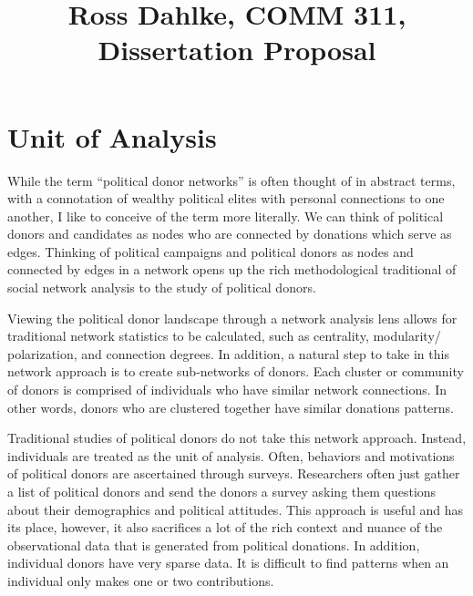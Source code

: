 \documentclass[12pt,]{article}
\title{Ross Dahlke, COMM 311, Dissertation Proposal  }
\author{}
\date{}
\begin{document}
	
%

{%
\setlength{\parindent}{0pt}
\thispagestyle{plain}
{\fontsize{18}{20}\selectfont\raggedright 
\maketitle  %

}

{
   \vskip 13.5pt\relax \normalsize\fontsize{11}{12} 
 

}

}






\vskip -8.5pt



\noindent \doublespacing 

\hypertarget{unit-of-analysis}{%
\section{Unit of Analysis}\label{unit-of-analysis}}

While the term ``political donor networks'' is often thought of in
abstract terms, with a connotation of wealthy political elites with
personal connections to one another, I like to conceive of the term more
literally. We can think of political donors and candidates as nodes who
are connected by donations which serve as edges. Thinking of political
campaigns and political donors as nodes and connected by edges in a
network opens up the rich methodological traditional of social network
analysis to the study of political donors.

Viewing the political donor landscape through a network analysis lens
allows for traditional network statistics to be calculated, such as
centrality, modularity/ polarization, and connection degrees. In
addition, a natural step to take in this network approach is to create
sub-networks of donors. Each cluster or community of donors is comprised
of individuals who have similar network connections. In other words,
donors who are clustered together have similar donations patterns.

Traditional studies of political donors do not take this network
approach. Instead, individuals are treated as the unit of analysis.
Often, behaviors and motivations of political donors are ascertained
through surveys. Researchers often just gather a list of political
donors and send the donors a survey asking them questions about their
demographics and political attitudes. This approach is useful and has
its place, however, it also sacrifices a lot of the rich context and
nuance of the observational data that is generated from political
donations. In addition, individual donors have very sparse data. It is
difficult to find patterns when an individual only makes one or two
contributions.
\end{document}
